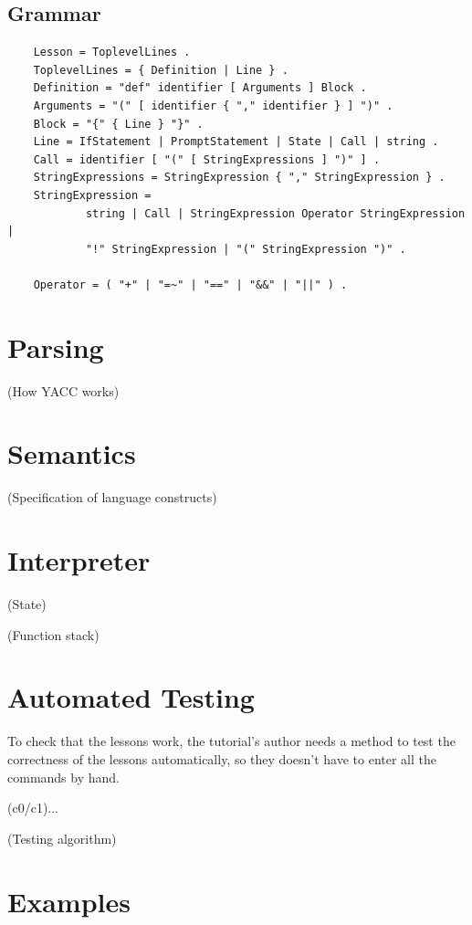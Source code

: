 \documentclass[a4paper,twoside,abstract=on,cleardoublepage=empty,numbers=noenddot,toc=bib]{scrreprt}
\begin{document}
\subsection{Grammar}

\begin{lstlisting}
    Lesson = ToplevelLines .
    ToplevelLines = { Definition | Line } .
    Definition = "def" identifier [ Arguments ] Block .
    Arguments = "(" [ identifier { "," identifier } ] ")" .
    Block = "{" { Line } "}" .
    Line = IfStatement | PromptStatement | State | Call | string .
    Call = identifier [ "(" [ StringExpressions ] ")" ] .
    StringExpressions = StringExpression { "," StringExpression } .
    StringExpression =
            string | Call | StringExpression Operator StringExpression |
            "!" StringExpression | "(" StringExpression ")" .

    Operator = ( "+" | "=~" | "==" | "&&" | "||" ) .
\end{lstlisting}

\section{Parsing}

(How YACC works)

\section{Semantics}

(Specification of language constructs)

\section{Interpreter}

(State)

(Function stack)

\section{Automated Testing}

To check that the lessons work, the tutorial's author needs a method to test the correctness of the lessons automatically, so they doesn't have to enter all the commands by hand.

(c0/c1)...

(Testing algorithm)

\section{Examples}
\end{document}
